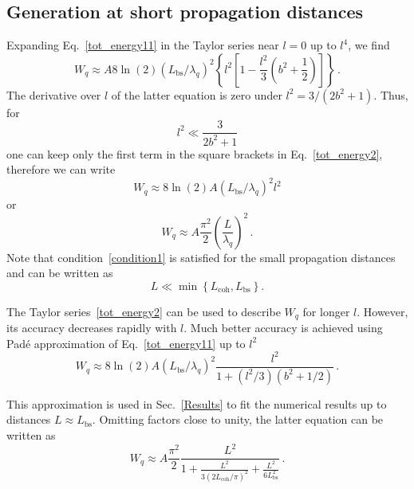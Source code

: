 \subsection{Generation at short propagation distances}
%
Expanding Eq.~\eqref{tot_energy11} in the Taylor series near $l=0$ up to $l^4$, we find
\begin{equation}
W_q \approx  A 8 \ln (2) (L_\mathrm{bs}/ \lambda_q)^2
\left\{  l^2  \left[1-\frac{l^2}{3}\left(b^2+\frac{1}{2}\right)\right]
\right\} \, .
\label{tot_energy2}
\end{equation}
The derivative over $l$ of the latter equation is zero under $l^2=3/(2b^2+1)$. Thus, for
\begin{equation}
 l^2  \ll \frac{3}{2 b^2+1}
 \label{condition1}
\end{equation}
one can keep only the first term in the square brackets in Eq.~\eqref{tot_energy2}, therefore we can write
\begin{equation}
W_q \approx 8 \ln (2) A (L_\mathrm{bs}/ \lambda_q)^2 l^2 
\label{tot_energy_short_L}
\end{equation}
 or
\begin{equation}
W_q \approx 
A \frac{\pi^2}{2} \left( \frac{L}{\lambda_q}\right)^2 \, .
\label{tot_energy_short_L1}
\end{equation}
Note that condition~\eqref{condition1} is satisfied for the small propagation distances and can be written as $$L \ll \min \left\{ L_\mathrm{coh}, L_\mathrm{bs} \right\}.$$

The Taylor series~\eqref{tot_energy2} can be used to describe $W_q$ for longer $l$. However, its accuracy decreases rapidly with $l$. Much better accuracy is achieved using Pad\'e approximation of Eq.~\eqref{tot_energy11} up to $l^2$
\begin{equation}
W_q \approx 8 \ln (2) A (L_\mathrm{bs}/ \lambda_q)^2 \frac{l^2}{1+(l^2/3)(b^2+1/2)} \, .
\label{Pade1}
\end{equation}

This approximation is used in Sec.~\ref{Results} to fit the numerical results up to distances $L \approx  L_\mathrm{bs}$. Omitting factors close to unity, the latter equation can be written as
\begin{equation}
W_q \approx A \frac{\pi^2}{2} \frac{L^2}{1+\frac{L^2}{3(2 L_\mathrm{coh}/\pi)^2}+ \frac{L^2}{6 L_\mathrm{bs}^2}} \, .
\label{Pade_approximation1}
\end{equation}

%
